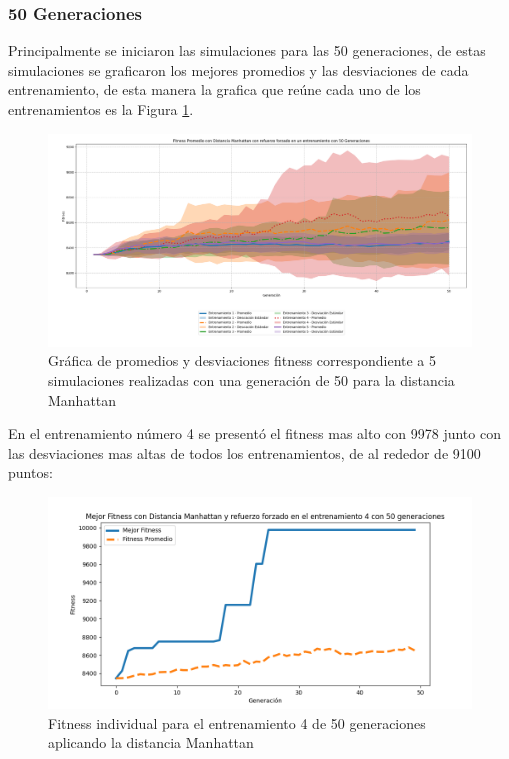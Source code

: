 \documentclass[conference]{IEEEtran}
\begin{document}
\subsubsection{50 Generaciones}
Principalmente se iniciaron las simulaciones para las 50 generaciones, de estas simulaciones se graficaron los mejores promedios y las desviaciones de cada entrenamiento, de esta manera la grafica que reúne cada uno de los entrenamientos es la Figura \ref{fig:Manhattan_50_genral}.
\begin{figure}[H]
    \centering
    \includegraphics[width=1\linewidth]{Manhattan/Fitness_Acumulado_Manh_50Gen.png}
    \caption{Gráfica de promedios y desviaciones fitness correspondiente a 5
simulaciones realizadas con una generación de 50 para la distancia Manhattan}
    \label{fig:Manhattan_50_genral}
\end{figure}
En el entrenamiento número 4 se presentó el fitness mas alto con 9978 junto con las desviaciones mas altas de todos los entrenamientos, de al rededor de 9100 puntos:
\begin{figure}[H]
    \centering
    \includegraphics[width=0.9\linewidth]{Manhattan/Fitness_Individual_50Gen/Fitness_4_Manh_50Gen.png}
    \caption{Fitness individual para el entrenamiento 4 de 50 generaciones aplicando la distancia Manhattan}
    \label{fig:Fitnes_man_4_50_inv}
\end{figure}
\end{document}
